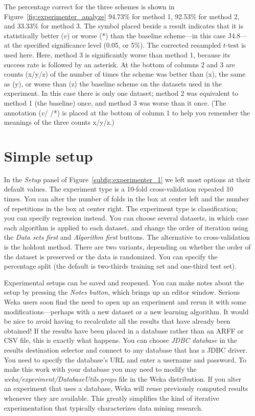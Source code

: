 The percentage correct for the three schemes is shown in
Figure~\ref{fig:experimenter_analyze} 94.73\% for method 1, 92.53\%
for method 2, and 33.33\% for method 3. The symbol placed beside a
result indicates that it is statistically better ($v$) or worse (*)
than the baseline scheme---in this case J4.8---at the specified
significance level (0.05, or 5\%). The corrected resampled $t$-test is
used here. Here, method 3 is significantly worse than method 1,
because its success rate is followed by an asterisk. At the bottom of
columns 2 and 3 are counts (x/y/z) of the number of times the scheme
was better than (x), the same as (y), or worse than (z) the baseline
scheme on the datasets used in the experiment. In this case there is
only one dataset; method 2 was equivalent to method 1 (the baseline)
once, and method 3 was worse than it once. (The annotation ($v$/  /*) is
placed at the bottom of column 1 to help you remember the meanings of
the three counts x/y/z.)

\section{Simple setup}

In the \textit{Setup} panel of Figure~\ref{subfig:experimenter_1} we
left most options at their default values. The experiment type is a
10-fold cross-validation repeated 10 times. You can alter the number
of folds in the box at center left and the number of repetitions in
the box at center right. The experiment type is classification; you
can specify regression instead. You can choose several datasets, in
which case each algorithm is applied to each dataset, and change the
order of iteration using the \textit{Data sets first} and
\textit{Algorithm first} buttons. The alternative to cross-validation
is the holdout method. There are two variants, depending on whether
the order of the dataset is preserved or the data is randomized. You
can specify the percentage split (the default is two-thirds training
set and one-third test set).

Experimental setups can be saved and reopened. You can make notes
about the setup by pressing the \textit{Notes button}, which brings up
an editor window. Serious Weka users soon find the need to open up an
experiment and rerun it with some modifications---perhaps with a new
dataset or a new learning algorithm. It would be nice to avoid having
to recalculate all the results that have already been obtained! If the
results have been placed in a database rather than an ARFF or CSV
file, this is exactly what happens. You can choose \textit{JDBC
  database} in the results destination selector and connect to any
database that has a JDBC driver. You need to specify the database’s
URL and enter a username and password. To make this work with your
database you may need to modify the
\textit{weka/experiment/DatabaseUtils.props} file in the Weka
distribution. If you alter an experiment that uses a database, Weka
will reuse previously computed results whenever they are
available. This greatly simplifies the kind of iterative
experimentation that typically characterizes data mining research.


